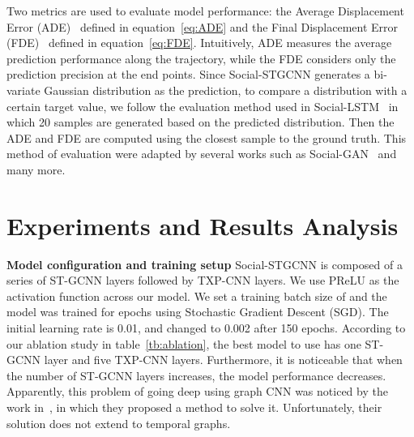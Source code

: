\documentclass[10pt,twocolumn,letterpaper]{article}
\newcommand*{\ours}{Social-STGCNN }
\begin{document}
Two metrics are used to evaluate model performance: the Average Displacement Error (ADE)~\cite{pellegrini2009you} defined in equation~\ref{eq:ADE} and the Final Displacement Error (FDE)~\cite{alahi2016social} defined in equation~\ref{eq:FDE}. Intuitively, ADE measures the average prediction performance along the trajectory, while the FDE considers only the prediction precision at the end points. Since \ours generates a bi-variate Gaussian distribution as the prediction, to compare a distribution with a certain target value, we follow the evaluation method used in Social-LSTM~\cite{alahi2016social} in which 20 samples are generated based on the predicted distribution. Then  the ADE and FDE are computed using the closest sample to the ground truth. This method of evaluation were adapted by several works such as Social-GAN~\cite{gupta2018social} and many more.






\section{Experiments and Results Analysis}
\label{sec:results}

\noindent
\textbf{Model configuration and training setup}
\ours is composed of a series of ST-GCNN layers followed by TXP-CNN layers. We use PReLU\cite{he2015delving} as the activation function  across our model. We set a training batch size of  and the model was trained for  epochs using Stochastic Gradient Descent (SGD). The initial learning rate is 0.01, and changed to 0.002 after 150 epochs. According to our ablation study in table~\ref{tb:ablation}, the best model to use has one ST-GCNN layer and five TXP-CNN layers. Furthermore, it is noticeable that when the number of ST-GCNN layers increases, the model performance decreases. Apparently, this problem of going deep using graph CNN was noticed by the work in~\cite{li2019deepgcns}, in which they proposed a method to solve it. Unfortunately, their solution does not extend to temporal graphs.
\end{document}
